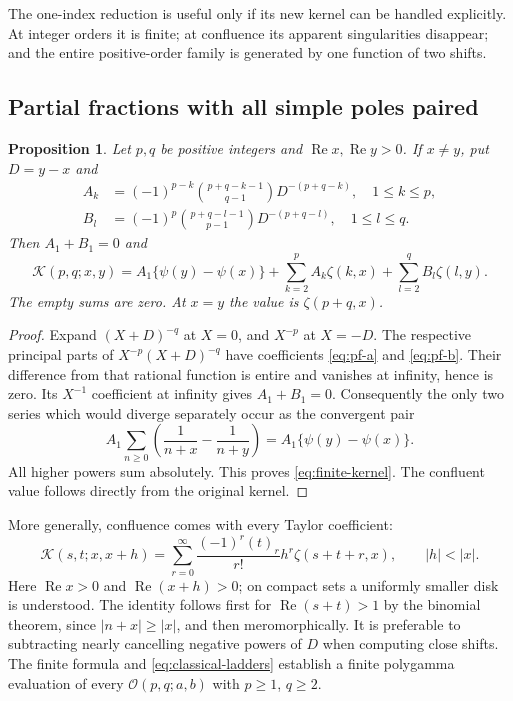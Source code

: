 \documentclass[11pt,a4paper]{article}
\numberwithin{equation}{section}
\newtheorem{proposition}[theorem]{Proposition}
\theoremstyle{definition}
\theoremstyle{remark}
\newcommand{\Rea}{\operatorname{Re}}
\newcommand{\Ord}{\mathcal O}
\newcommand{\Kern}{\mathcal K}
\begin{document}
The one-index reduction is useful only if its new kernel can be handled
explicitly. At integer orders it is finite; at confluence its apparent
singularities disappear; and the entire positive-order family is
generated by one function of two shifts.

\subsection{Partial fractions with all simple poles paired}

\begin{proposition}\label{prop:partial-fractions}
Let $p,q$ be positive integers and $\Rea x,\Rea y>0$. If $x\ne y$, put
$D=y-x$ and
\begin{align}
 A_k&=(-1)^{p-k}\binom{p+q-k-1}{q-1}D^{-(p+q-k)},\quad 1\le k\le p,
 \label{eq:pf-a}\\
 B_l&=(-1)^p\binom{p+q-l-1}{p-1}D^{-(p+q-l)},\quad 1\le l\le q.
 \label{eq:pf-b}
\end{align}
Then $A_1+B_1=0$ and
\begin{equation}\label{eq:finite-kernel}
 \Kern(p,q;x,y)=A_1\{\psi(y)-\psi(x)\}
 +\sum_{k=2}^{p}A_k\zeta(k,x)
 +\sum_{l=2}^{q}B_l\zeta(l,y).
\end{equation}
The empty sums are zero. At $x=y$ the value is $\zeta(p+q,x)$.
\end{proposition}

\begin{proof}
Expand $(X+D)^{-q}$ at $X=0$, and $X^{-p}$ at $X=-D$.
The respective principal parts of $X^{-p}(X+D)^{-q}$ have coefficients
\eqref{eq:pf-a} and \eqref{eq:pf-b}. Their difference from that rational
function is entire and vanishes at infinity, hence is zero.
Its $X^{-1}$ coefficient at infinity gives $A_1+B_1=0$.
Consequently the only two series which would diverge separately occur
as the convergent pair
\[
 A_1\sum_{n\ge0}\left(\frac1{n+x}-\frac1{n+y}\right)
 =A_1\{\psi(y)-\psi(x)\}.
\]
All higher powers sum absolutely. This proves \eqref{eq:finite-kernel}.
The confluent value follows directly from the original kernel.
\end{proof}

More generally, confluence comes with every Taylor coefficient:
\begin{equation}\label{eq:kernel-confluence}
 \Kern(s,t;x,x+h)=\sum_{r=0}^{\infty}
 \frac{(-1)^r(t)_r}{r!}h^r\zeta(s+t+r,x),\qquad |h|<|x|.
\end{equation}
Here $\Rea x>0$ and $\Rea(x+h)>0$; on compact sets a uniformly
smaller disk is understood.
The identity follows first for $\Rea(s+t)>1$ by the binomial theorem,
since $|n+x|\ge |x|$, and then meromorphically. It is preferable to
subtracting nearly cancelling negative powers of $D$ when computing
close shifts. The finite formula and \eqref{eq:classical-ladders}
establish a finite polygamma evaluation of every
$\Ord(p,q;a,b)$ with $p\ge1$, $q\ge2$.
\end{document}
